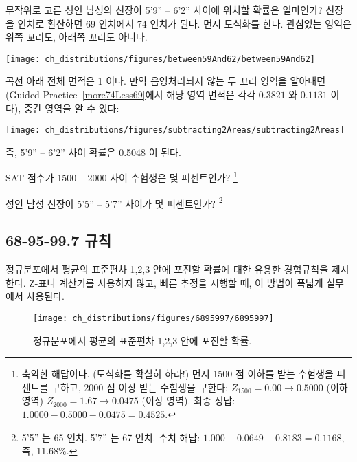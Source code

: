 \begin{example}{무작위로 고른 성인 남성의 신장이 5'9'' -- 6'2'' 사이에 위치할 확률은 얼마인가?}
신장을 인치로 환산하면 69 인치에서 74 인치가 된다. 먼저 도식화를 한다. 관심있는 영역은 위쪽 꼬리도, 아래쪽 꼬리도 아니다.\textC{\vspace{-2mm}}
\begin{center}
\texttt{[image: ch\_distributions/figures/between59And62/between59And62]}\textC{\vspace{-2mm}}
\end{center}
곡선 아래 전체 면적은 1 이다. 만약 음영처리되지 않는 두 꼬리 영역을 알아내면(Guided Practice~\ref{more74Less69}에서 해당 영역 면적은 각각 $0.3821$ 와 $0.1131$ 이다), 중간 영역을 알 수 있다: \textC{\vspace{-2mm}}
\begin{center}
\texttt{[image: ch\_distributions/figures/subtracting2Areas/subtracting2Areas]}\textC{\vspace{-2mm}}
\end{center}
즉, 5'9'' -- 6'2'' 사이 확률은 0.5048 이 된다.
\end{example}

\begin{exercise}
SAT 점수가 1500 -- 2000 사이 수험생은 몇 퍼센트인가? \footnote{축약한 해답이다. (도식화를 확실히 하라!) 
먼저 1500 점 이하를 받는 수험생을 퍼센트를 구하고, 2000 점 이상 받는 수험생을 구한다: $Z_{1500} = 0.00 \to 0.5000$ (이하 영역) $Z_{2000} = 1.67 \to 0.0475$ (이상 영역). 최종 정답: $1.0000-0.5000 - 0.0475 = 0.4525$.}
\end{exercise}

\begin{exercise}
성인 남성 신장이 5'5'' -- 5'7'' 사이가 몇 퍼센트인가? \footnote{5'5'' 는 65 인치. 5'7'' 는 67 인치. 수치 해답: $1.000 - 0.0649 - 0.8183 = 0.1168$, 즉, 11.68\%.}
\end{exercise}



\subsection{68-95-99.7 규칙}
정규분포에서 평균의 표준편차 1,2,3 안에 포진할 확률에 대한 유용한 경험규칙을 제시한다. Z-표나 계산기를 사용하지 않고, 빠른 추정을 시행할 때, 이 방법이 폭넓게 실무에서 사용된다.

\begin{figure}[hht]
\centering
\texttt{[image: ch\_distributions/figures/6895997/6895997]}
\caption{정규분포에서 평균의 표준편차 1,2,3 안에 포진할 확률.}
\label{6895997}
\end{figure}

